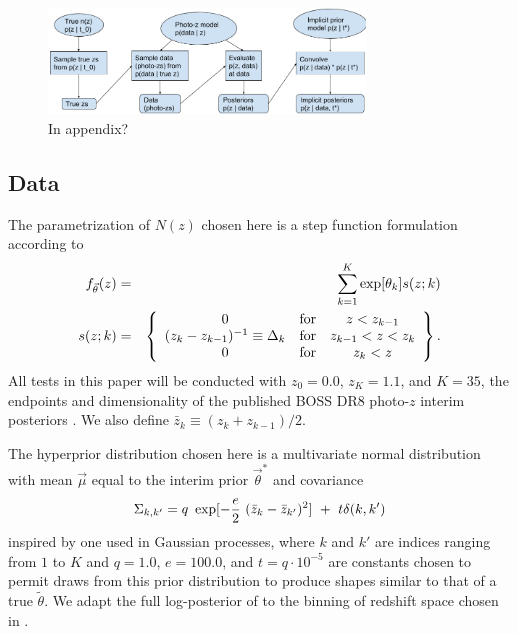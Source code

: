 
\begin{figure}
	\begin{center}
		\includegraphics[width=0.75\textwidth]{figures/chippr/flowchart.png}
		\caption{In appendix?}
	\end{center}
\end{figure}

\subsection{Data}

The parametrization of $N(z)$ chosen here is a step function formulation according to
\begin{eqnarray}
\eqlabel{eq:steps}
f_{\vec{\theta}}(z)&=&\sum_{k=1}^{K}\exp[\theta_{k}]s(z;k)\\
s(z;k)&=&\left\{\begin{array}{ccc}0&\text{for}&z<z_{k-1}\\(z_{k}-z_{k-1})^{-1} \equiv\Delta_{k}&\text{for}&z_{k-1}<z<z_{k}\\0&\text{for}&z_{k}<z\end{array}\right
\}.
\end{eqnarray}
All tests in this paper will be conducted with $z_{0}=0.0$, $z_{K}=1.1$, and $K=35$, the endpoints and dimensionality of the published BOSS DR8 photo-$z$ interim posteriors \citet{Sheldon2012}.  
We also define $\bar{z}_{k}\equiv(z_{k}+z_{k-1})/2$.

The hyperprior distribution chosen here is a multivariate normal distribution with mean $\vec{\mu}$ equal to the interim prior $\vec{\theta}^{*}$ and covariance
\begin{equation}
\eqlabel{eq:priorcov}
\Sigma_{k,k'} = q\ \exp[-\frac{e}{2}\ (\bar{z}_{k}-\bar{z}_{k'})^{2}]\ +\ t\delta(k,k')
\end{equation}
inspired by one used in Gaussian processes, where $k$ and $k'$ are indices ranging from $1$ to $K$ and $q=1.0$, $e=100.0$, and $t=q\cdot10^{-5}$ are constants chosen to permit draws from this prior distribution to produce shapes similar to that of a true $\tilde{\theta}$.  
We adapt the full log-posterior of  to the binning of redshift space chosen in .

